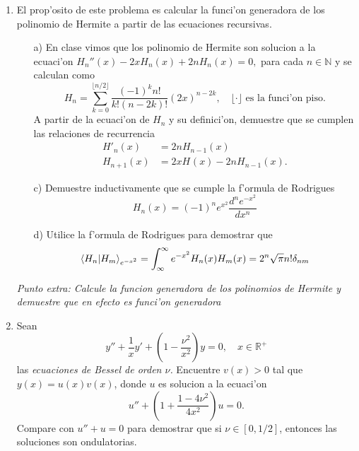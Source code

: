 \documentclass[letterpaper]{article}
\newcommand{\nat}{\ensuremath{ \mathbb N }}
\newcommand{\re}{\ensuremath{\mathbb R }}
\begin{document}
\begin{enumerate}
  \item El prop'osito de este problema es calcular la funci'on generadora de los polinomio de Hermite a partir de las ecuaciones recursivas.
        \begin{itemize}
          \item[a)] En clase vimos que los polinomio de Hermite son solucion a la ecuaci'on $H_{n}''(x)-2xH_{n}(x)+2nH_{n}(x)=0,$ para cada $n\in\nat$ y se calculan como
\[
      H_{n}=\sum_{k=0}^{\lfloor n/2\rfloor}\frac{(-1)^{k}n!}{k!(n-2k)!}(2x)^{n-2k},\quad\lfloor\cdot\rfloor\text{ es la funci'on piso.}
\]
          A partir de la ecuaci'on de $H_{n}$ y su definici'on, demuestre que se cumplen las relaciones de recurrencia
          \begin{align*}
            H'_{n}(x)&=2nH_{n-1}(x)\\
            H_{n+1}(x)&=2xH_{}(x)-2nH_{n-1}(x).
          \end{align*}
          \item[c)] Demuestre inductivamente que se cumple la f'ormula de Rodrigues
                \[
                H_{n}(x)=(-1)^{n}e^{x^{2}}\dfrac{d^{n}e^{-x^{2}}}{dx^{n}}
                \]
          \item[d)] Utilice la f'ormula de Rodrigues para demostrar que
                \[
                \braket{H_{n}|H_{m}}_{e^{-x^{2}}}=\int_{\infty}^{\infty}e^{-x^{2}}H_{n}(x)H_{m}(x)=2^{n}\sqrt{\pi}n!\delta_{nm}
                \]
        \end{itemize}
\noindent\emph{Punto extra: Calcule la funcion generadora de los polinomios de Hermite y demuestre que en efecto es funci'on generadora}

  \item Sean
\begin{equation}
  y''+\frac{1}{x}y'+\left(1-\frac{\nu^{2}}{x^{2}}\right)y=0,\quad x\in\re^{+}
\end{equation}
las \emph{ecuaciones de Bessel de orden \(\nu\).} Encuentre \(v(x)>0\) tal que \hbox{\(y(x)=u(x)v(x)\)}, donde $u$ es solucion a la ecuaci'on
\[
  u''+\left(1+\frac{1-4\nu^{2}}{4x^{2}}\right)u=0.
\]
Compare con \(u''+u=0\) para demostrar que si \(\nu\in[0,1/2]\), entonces las soluciones son ondulatorias.
\end{enumerate}
\end{document}
